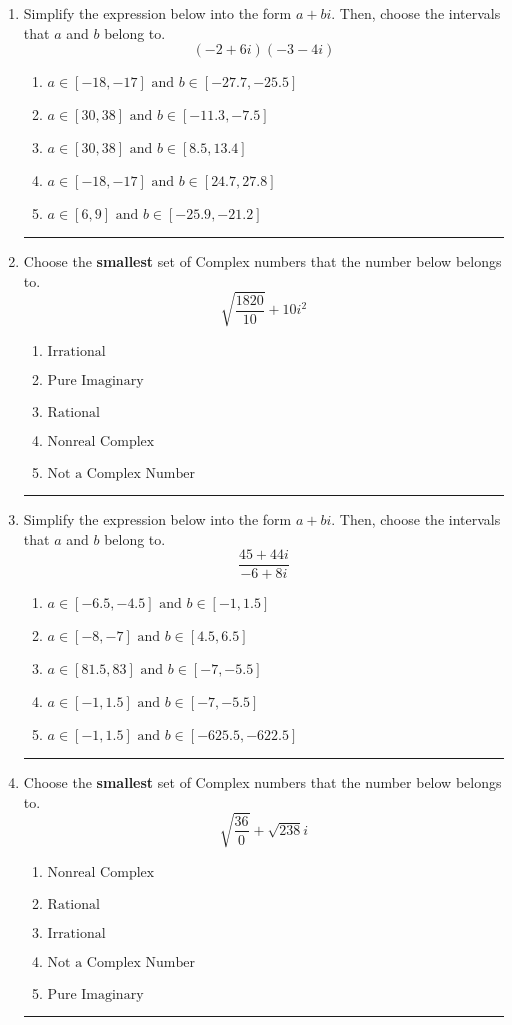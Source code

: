 \documentclass[14pt]{extbook}
\newcommand{\litem}[1]{\item#1\hspace*{-1cm}\rule{\textwidth}{0.4pt}}
\begin{document}
\begin{enumerate}
{\begin{enumerate}[label=\Alph*.]
\end{enumerate} }
\litem{
Simplify the expression below into the form $a+bi$. Then, choose the intervals that $a$ and $b$ belong to.\[ (-2 + 6 i)(-3 - 4 i) \]\begin{enumerate}[label=\Alph*.]
\item \( a \in [-18, -17] \text{ and } b \in [-27.7, -25.5] \)
\item \( a \in [30, 38] \text{ and } b \in [-11.3, -7.5] \)
\item \( a \in [30, 38] \text{ and } b \in [8.5, 13.4] \)
\item \( a \in [-18, -17] \text{ and } b \in [24.7, 27.8] \)
\item \( a \in [6, 9] \text{ and } b \in [-25.9, -21.2] \)

\end{enumerate} }
\litem{
Choose the \textbf{smallest} set of Complex numbers that the number below belongs to.\[ \sqrt{\frac{1820}{10}}+10i^2 \]\begin{enumerate}[label=\Alph*.]
\item \( \text{Irrational} \)
\item \( \text{Pure Imaginary} \)
\item \( \text{Rational} \)
\item \( \text{Nonreal Complex} \)
\item \( \text{Not a Complex Number} \)

\end{enumerate} }
\litem{
Simplify the expression below into the form $a+bi$. Then, choose the intervals that $a$ and $b$ belong to.\[ \frac{45 + 44 i}{-6 + 8 i} \]\begin{enumerate}[label=\Alph*.]
\item \( a \in [-6.5, -4.5] \text{ and } b \in [-1, 1.5] \)
\item \( a \in [-8, -7] \text{ and } b \in [4.5, 6.5] \)
\item \( a \in [81.5, 83] \text{ and } b \in [-7, -5.5] \)
\item \( a \in [-1, 1.5] \text{ and } b \in [-7, -5.5] \)
\item \( a \in [-1, 1.5] \text{ and } b \in [-625.5, -622.5] \)

\end{enumerate} }
\litem{
Choose the \textbf{smallest} set of Complex numbers that the number below belongs to.\[ \sqrt{\frac{36}{0}}+\sqrt{238} i \]\begin{enumerate}[label=\Alph*.]
\item \( \text{Nonreal Complex} \)
\item \( \text{Rational} \)
\item \( \text{Irrational} \)
\item \( \text{Not a Complex Number} \)
\item \( \text{Pure Imaginary} \)


\end{enumerate}}
\end{enumerate}
\end{document}
